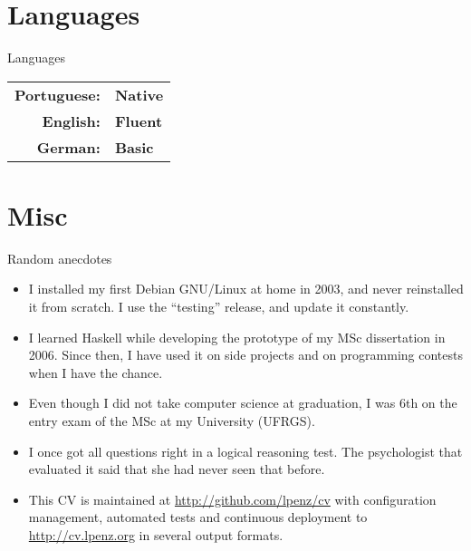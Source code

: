 \documentclass[ignorenonframetext]{beamer}
\newcommand{\myemphe}[1]{{\color{dark27c5}\bf #1}}
\newcommand{\myemphg}[1]{{\color{dark27c7}\bf #1}}
\begin{document}
\section{Languages}

\begin{frame}{Languages}
    \begin{tabular}{rl}
        
        \myemphe{Portuguese:}&\myemphg{Native}\\
        
        \myemphe{English:}&\myemphg{Fluent}\\
        
        \myemphe{German:}&\myemphg{Basic}\\
        
    \end{tabular}
\end{frame}


\section{Misc}

\begin{frame}[allowframebreaks]{Random anecdotes}
    \begin{itemize}
        
        \item I installed my first Debian GNU/Linux at home in 2003, and never
reinstalled it from scratch. I use the ``testing'' release, and update
it constantly.

        
        \item I learned Haskell while developing the prototype of my MSc dissertation
in 2006. Since then, I have used it on side projects and on programming
contests when I have the chance.

        
        \item Even though I did not take computer science at graduation, I was 6th on
the entry exam of the MSc at my University (UFRGS).

        
        \item I once got all questions right in a logical reasoning test. The
psychologist that evaluated it said that she had never seen that before.

        
        \item This CV is maintained at \url{http://github.com/lpenz/cv} with
configuration management, automated tests and continuous deployment to
\url{http://cv.lpenz.org} in several output formats.

        
    \end{itemize}
\end{frame}
\end{document}
